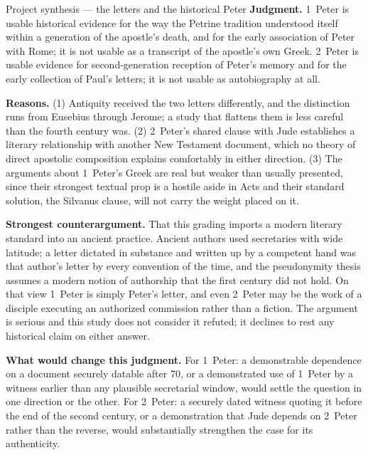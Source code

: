 \begin{studybox}{Project synthesis --- the letters and the historical Peter}
\textbf{Judgment.} 1~Peter is usable historical evidence for the way the
Petrine tradition understood itself within a generation of the apostle's
death, and for the early association of Peter with Rome; it is not usable as
a transcript of the apostle's own Greek. 2~Peter is usable evidence for
second-generation reception of Peter's memory and for the early collection of
Paul's letters; it is not usable as autobiography at all.

\textbf{Reasons.} (1) Antiquity received the two letters differently, and the
distinction runs from Eusebius through Jerome; a study that flattens them is
less careful than the fourth century was. (2) 2~Peter's shared clause with
Jude establishes a literary relationship with another New Testament document,
which no theory of direct apostolic composition explains comfortably in
either direction. (3) The arguments about 1~Peter's Greek are real but
weaker than usually presented, since their strongest textual prop is a
hostile aside in Acts and their standard solution, the Silvanus clause, will
not carry the weight placed on it.

\textbf{Strongest counterargument.} That this grading imports a modern
literary standard into an ancient practice. Ancient authors used secretaries
with wide latitude; a letter dictated in substance and written up by a
competent hand was that author's letter by every convention of the time, and
the pseudonymity thesis assumes a modern notion of authorship that the first
century did not hold. On that view 1~Peter is simply Peter's letter, and even
2~Peter may be the work of a disciple executing an authorized commission
rather than a fiction. The argument is serious and this study does not
consider it refuted; it declines to rest any historical claim on either
answer.

\textbf{What would change this judgment.} For 1~Peter: a demonstrable
dependence on a document securely datable after 70, or a demonstrated use of
1~Peter by a witness earlier than any plausible secretarial window, would
settle the question in one direction or the other. For 2~Peter: a securely
dated witness quoting it before the end of the second century, or a
demonstration that Jude depends on 2~Peter rather than the reverse, would
substantially strengthen the case for its authenticity.
\end{studybox}

